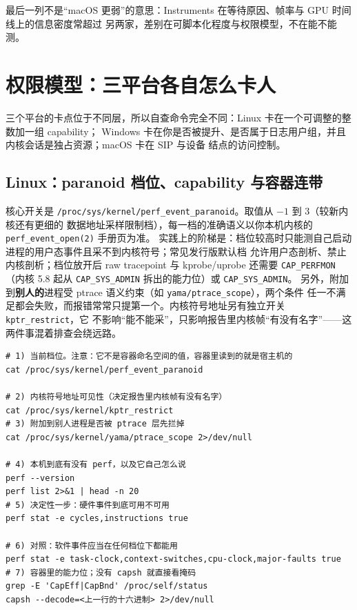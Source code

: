 \documentclass[12pt,a4paper,fontset=fandol]{ctexbook}
\newcommand{\Tp}[1]{\texttt{#1}}
\newcommand{\Bk}{\discretionary{}{}{}}
\begin{document}
最后一列不是``macOS 更弱''的意思：Instruments 在等待原因、帧率与 GPU 时间线上的信息密度常超过
另两家，差别在可脚本化程度与权限模型，不在能不能测。

\section{权限模型：三平台各自怎么卡人}
\label{sec:pmapA-perm}

三个平台的卡点位于不同层，所以自查命令完全不同：Linux 卡在一个可调整的整数加一组 capability；
Windows 卡在你是否被提升、是否属于日志用户组，并且内核会话是独占资源；macOS 卡在 SIP 与设备
结点的访问控制。

\subsection{Linux：paranoid 档位、capability 与容器连带}

核心开关是 \Tp{/proc/sys/kernel/perf\_event{\Bk}\_paranoid}。取值从 $-1$ 到 3（较新内核还有更细的
数据地址采样限制档），每一档的准确语义以你本机内核的 \Tp{perf\_event{\Bk}\_open(2)} 手册页为准。
实践上的阶梯是：档位较高时只能测自己启动进程的用户态事件且采不到内核符号；常见发行版默认档
允许用户态剖析、禁止内核剖析；档位放开后 raw tracepoint 与 kprobe/uprobe 还需要
\Tp{CAP\_PERFMON}（内核 5.8 起从 \Tp{CAP\_SYS\_ADMIN} 拆出的能力位）或 \Tp{CAP\_SYS\_ADMIN}。
另外，附加到\textbf{别人的}进程受 ptrace 语义约束（如 \Tp{yama/ptrace{\Bk}\_scope}），两个条件
任一不满足都会失败，而报错常常只提第一个。内核符号地址另有独立开关 \Tp{kptr\_restrict}，它
不影响``能不能采''，只影响报告里内核帧``有没有名字''——这两件事混着排查会绕远路。

\begin{lstlisting}[style=shellstyle, caption={Linux 权限自查：逐条可复制执行，输出决定后面能做什么}, label={lst:pmapA-linux-perm}]
# 1) 当前档位。注意：它不是容器命名空间的值，容器里读到的就是宿主机的
cat /proc/sys/kernel/perf_event_paranoid

# 2) 内核符号地址可见性（决定报告里内核帧有没有名字）
cat /proc/sys/kernel/kptr_restrict
# 3) 附加到别人进程是否被 ptrace 层先拦掉
cat /proc/sys/kernel/yama/ptrace_scope 2>/dev/null

# 4) 本机到底有没有 perf，以及它自己怎么说
perf --version
perf list 2>&1 | head -n 20
# 5) 决定性一步：硬件事件到底可用不可用
perf stat -e cycles,instructions true

# 6) 对照：软件事件应当在任何档位下都能用
perf stat -e task-clock,context-switches,cpu-clock,major-faults true
# 7) 容器里的能力位；没有 capsh 就直接看掩码
grep -E 'CapEff|CapBnd' /proc/self/status
capsh --decode=<上一行的十六进制> 2>/dev/null
\end{lstlisting}
\end{document}
